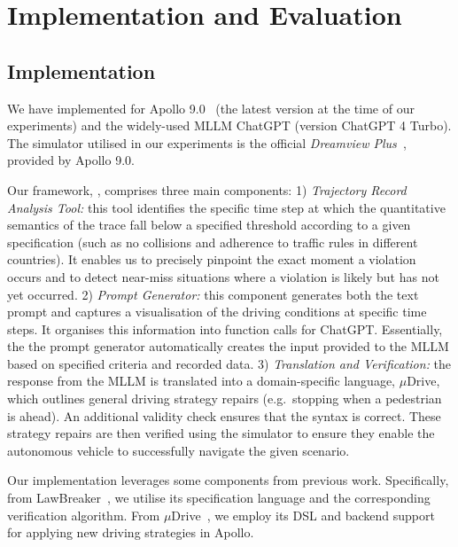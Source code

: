 \section{Implementation and Evaluation}
\label{sec:implementation_evaluation}


\subsection{Implementation}
We have implemented \coolname for Apollo 9.0~\cite{apollo90} (the latest version at the time of our experiments) and the widely-used MLLM ChatGPT (version ChatGPT 4 Turbo). The simulator utilised in our experiments is the official \emph{Dreamview Plus~\cite{dreamview_plus}}, provided by Apollo 9.0. 

Our framework, \coolname, comprises three main components:
1) \emph{Trajectory Record Analysis Tool:} this tool identifies the specific time step at which the quantitative semantics of the trace fall below a specified threshold according to a given specification (such as no collisions and adherence to traffic rules in different countries). It enables us to precisely pinpoint the exact moment a violation occurs and to detect near-miss situations where a violation is likely but has not yet occurred.
2) \emph{Prompt Generator:} this component generates both the text prompt and captures a visualisation of the driving conditions at specific time steps. It organises this information into function calls for ChatGPT. Essentially, the the prompt generator automatically creates the input provided to the MLLM based on specified criteria and recorded data.
3) \emph{Translation and Verification:} the response from the MLLM is translated into a domain-specific language, $\mu$Drive, which outlines general driving strategy repairs (e.g.~stopping when a pedestrian is ahead). An additional validity check ensures that the syntax is correct.  These strategy repairs are then verified using the simulator to ensure they enable the autonomous vehicle to successfully navigate the given scenario.

Our implementation leverages some components from previous work. Specifically, from LawBreaker~\cite{Sun-Poskitt-et_al22a}, we utilise its specification language and the corresponding verification algorithm. From $\mu$Drive~\cite{wang2024mudrive}, we employ its DSL and backend support for applying new driving strategies in Apollo.




